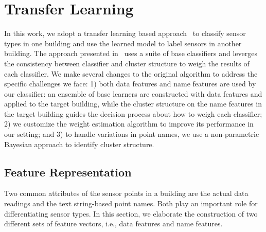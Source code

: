 \section{Transfer Learning}
In this work, we adopt a transfer learning based approach~\cite{lwe} to classify sensor types 
in one building and use the learned model to label sensors in another building.
The approach presented in~\cite{lwe} uses a suite of base classifiers and leverges the consistency between classifier and cluster structure 
to weigh the results of each classifier.
We make several changes to the original algorithm to address the specific challenges we face: 
1) both data features and name features are used by our classifier: an 
ensemble of base learners are constructed with data features and applied to the target building, while the 
cluster structure on the name features in the target building guides the decision process about how to weigh each classifier; %
2) we customize the weight estimation algorithm to improve its performance in our setting; %
and 3) to handle variations in point names, we use a non-parametric Bayesian approach to identify cluster structure.

\subsection{Feature Representation}\label{feature}
Two common attributes of the sensor points in a building are the actual data readings and the text string-based point names. Both play an important role for differentiating sensor types.
In this section, we elaborate the construction of two different sets of feature vectors, i.e., data features and name features.

